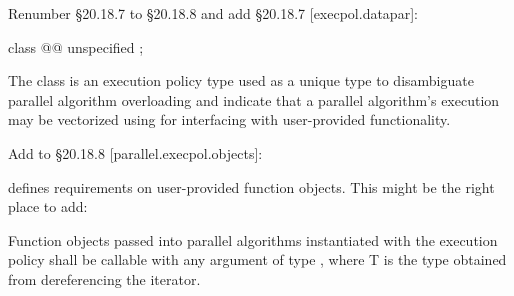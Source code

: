 Renumber §20.18.7 to §20.18.8 and add §20.18.7 [execpol.datapar]:
\begin{wgText}
  \color{WgAdd}
  \begin{itemdecl}
class @\dataparEPT{}@ { unspecified };
  \end{itemdecl}
  \begin{itemdescr}
    \pnum The class \dataparEPT is an execution policy type used as a unique type to disambiguate parallel algorithm overloading and indicate that a parallel algorithm's execution may be vectorized using \datapar for interfacing with user-provided functionality.
  \end{itemdescr}
\end{wgText}

Add to §20.18.8 [parallel.execpol.objects]:
\begin{wgText}
  \ttfamily{}
\end{wgText}

\citep[§25.2.2]{N4582} defines requirements on user-provided function objects.
This might be the right place to add:
\begin{wgText}
  \addtocounter{Paras}{1}
  \color{WgAdd}
  \pnum Function objects passed into parallel algorithms instantiated with the \dataparEP execution policy shall be callable with any argument of type \datapar[<T, Abi>], where \type T is the type obtained from dereferencing the iterator.
\end{wgText}

